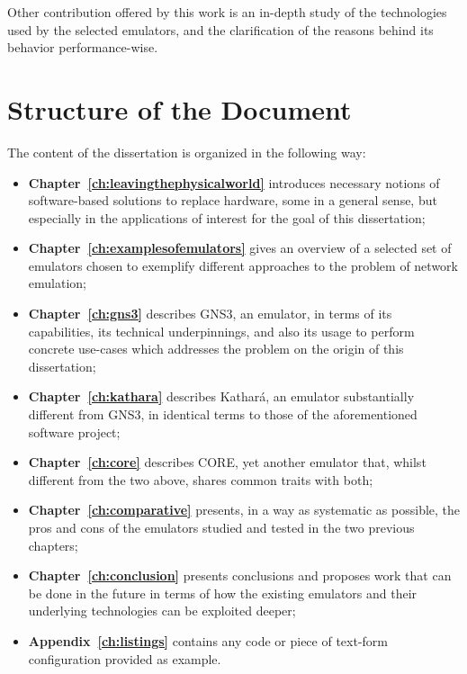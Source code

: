 Other contribution offered by this work is an in-depth study of the technologies used by the selected emulators, and the clarification of the reasons behind its behavior performance-wise.

\section{Structure of the Document}
\label{sec:structure}

The content of the dissertation is organized in the following way:
\begin{itemize}
  \item \textbf{Chapter~\ref{ch:leavingthephysicalworld}} introduces necessary notions of software-based solutions to replace hardware, some in a general sense, but especially in the applications of interest for the goal of this dissertation;
  \item \textbf{Chapter~\ref{ch:examplesofemulators}} gives an overview of a selected set of emulators chosen to exemplify different approaches to the problem of network emulation;
  \item \textbf{Chapter~\ref{ch:gns3}} describes GNS3, an emulator, in terms of its capabilities, its technical underpinnings, and also its usage to perform concrete use-cases which addresses the problem on the origin of this dissertation;
  \item \textbf{Chapter~\ref{ch:kathara}} describes Kathará, an emulator substantially different from GNS3, in identical terms to those of the aforementioned software project;
  \item \textbf{Chapter~\ref{ch:core}} describes CORE, yet another emulator that, whilst different from the two above, shares common traits with both;
  \item \textbf{Chapter~\ref{ch:comparative}} presents, in a way as systematic as possible, the pros and cons of the emulators studied and tested in the two previous chapters;
  \item \textbf{Chapter~\ref{ch:conclusion}} presents conclusions and proposes work that can be done in the future in terms of how the existing emulators and their underlying technologies can be exploited deeper;
  \item \textbf{Appendix~\ref{ch:listings}} contains any code or piece of text-form configuration provided as example.
\end{itemize}

